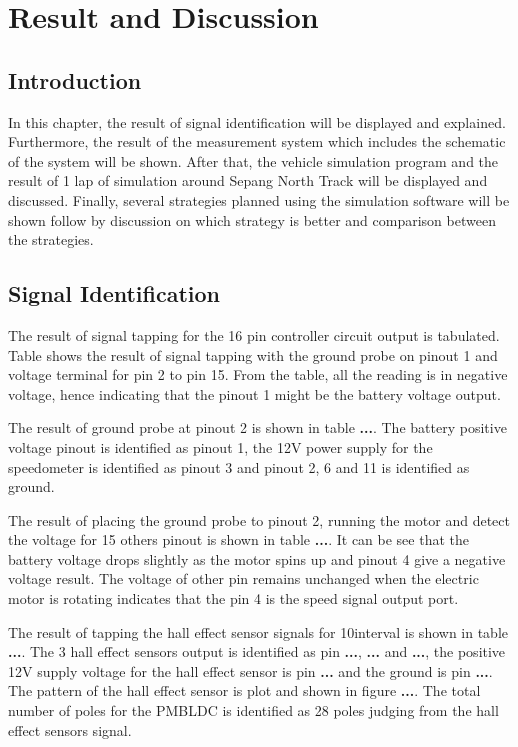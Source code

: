\chapter{Result and Discussion}

\section{Introduction}
In this chapter, the result of signal identification will be displayed and explained. Furthermore, the result of the measurement system which includes the schematic of the system will be shown. After that, the vehicle simulation program and the result of 1 lap of simulation around Sepang North Track will be displayed and discussed. Finally, several strategies planned using the simulation software will be shown follow by discussion on which strategy is better and comparison between the strategies.

\section{Signal Identification}

The result of signal tapping for the 16 pin controller circuit output is tabulated. Table \textbf{} shows the result of signal tapping with the ground probe on pinout 1 and voltage terminal for pin 2 to pin 15. From the table, all the reading is in negative voltage, hence indicating that the pinout 1 might be the battery voltage output.

The result of ground probe at pinout 2 is shown in table \textbf{...}. The battery positive voltage pinout is identified as pinout 1, the 12V power supply for the speedometer is identified as pinout 3 and pinout 2, 6 and 11 is identified as ground. 

The result of placing the ground probe to pinout 2, running the motor and detect the voltage for 15 others pinout is shown in table \textbf{...}. It can be see that the battery voltage drops slightly as the motor spins up and pinout 4 give a negative voltage result. The voltage of other pin remains unchanged when the electric motor is rotating indicates that the pin 4 is the speed signal output port.

The result of tapping the hall effect sensor signals for 10\textdegree interval is shown in table \textbf{...}. The 3 hall effect sensors output is identified as pin \textbf{...}, \textbf{...} and \textbf{...}, the positive 12V supply voltage for the hall effect sensor is pin \textbf{...} and the ground is pin \textbf{...}. The pattern of the hall effect sensor is plot and shown in figure \textbf{...}. The total number of poles for the PMBLDC is identified as 28 poles judging from the hall effect sensors signal.

